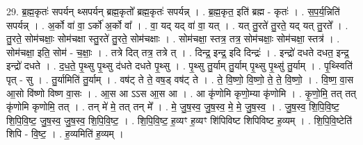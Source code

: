 \documentclass[17pt]{extarticle}
\begin{document}
29. ब्र॒ह्म॒कृतः॑ सपर्यन् थ्सपर्यन् ब्रह्म॒कृतो᳚ ब्रह्म॒कृतः॑ सपर्यन्न् । . ब्र॒ह्म॒कृत॒ इति॑ ब्रह्म - कृतः॑ । . स॒प॒र्य॒न्निति॑ सपर्यन्न् । . अ॒र्को वा॑ वा॒ ऽर्को॑ अ॒र्को वा᳚ । . वा॒ यद् यद् वा॑ वा॒ यत् । . यत् तु॒रते॑ तु॒रते॒ यद् यत् तु॒रते᳚ । . तु॒रते॒ सोम॑चक्षाः॒ सोम॑चक्षा स्तु॒रते॑ तु॒रते॒ सोम॑चक्षाः । . सोम॑चक्षा॒ स्तत्र॒ तत्र॒ सोम॑चक्षाः॒ सोम॑चक्षा॒ स्तत्र॑ । . सोम॑चक्षा॒ इति॒ सोम॑ - च॒क्षाः॒ । . तत्रे दित् तत्र॒ तत्रे त् । . दिन्द्र॒ इन्द्र॒ इदि दिन्द्रः॑ । . इन्द्रो॑ दधते दधत॒ इन्द्र॒ इन्द्रो॑ दधते । . द॒ध॒ते॒ पृ॒थ्सु पृ॒थ्सु द॑धते दधते पृ॒थ्सु । . पृ॒थ्सु तु॒र्याम् तु॒र्याम् पृ॒थ्सु पृ॒थ्सु॑ तु॒र्याम् । . पृ॒थ्स्विति॑ पृत् - सु । . तु॒र्यामिति॑ तु॒र्याम् । . वष॑ट् ते ते॒ वष॒ड् वष॑ट् ते । . ते॒ वि॒ष्णो॒ वि॒ष्णो॒ ते॒ ते॒ वि॒ष्णो॒ । . वि॒ष्ण॒ वा॒स आ॒सो वि॑ष्णो विष्ण वा॒सः । . आ॒स आ ऽऽस आ॒स आ । . आ कृ॑णोमि कृणो॒म्या कृ॑णोमि । . कृ॒णो॒मि॒ तत् तत् कृ॑णोमि कृणोमि॒ तत् । . तन् मे॑ मे॒ तत् तन् मे᳚ । . मे॒ जु॒ष॒स्व॒ जु॒ष॒स्व॒ मे॒ मे॒ जु॒ष॒स्व॒ । . जु॒ष॒स्व॒ शि॒पि॒वि॒ष्ट॒ शि॒पि॒वि॒ष्ट॒ जु॒ष॒स्व॒ जु॒ष॒स्व॒ शि॒पि॒वि॒ष्ट॒ । . शि॒पि॒वि॒ष्ट॒ ह॒व्यꣳ ह॒व्यꣳ शि॑पिविष्ट शिपिविष्ट ह॒व्यम् । . शि॒पि॒वि॒ष्टेति॑ शिपि - वि॒ष्ट॒ । . ह॒व्यमिति॑ ह॒व्यम् । \newline
\end{document}
